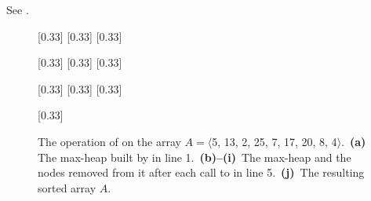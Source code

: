 See .
\begin{figure}[htb]
    \hspace*{-1.5cm}
    \newlength{\figurewidth}\setlength{\figurewidth}{\textwidth+1.5cm}
    \begin{minipage}{\figurewidth}
        \subcaptionbox{\label{fig:6.4-1a}}[0.33\figurewidth]{}
        \subcaptionbox{\label{fig:6.4-1b}}[0.33\figurewidth]{}
        \subcaptionbox{\label{fig:6.4-1c}}[0.33\figurewidth]{}
        \par\vspace{4ex}
        \subcaptionbox{\label{fig:6.4-1d}}[0.33\figurewidth]{}
        \subcaptionbox{\label{fig:6.4-1e}}[0.33\figurewidth]{}
        \subcaptionbox{\label{fig:6.4-1f}}[0.33\figurewidth]{}
        \par\vspace{4ex}
        \subcaptionbox{\label{fig:6.4-1g}}[0.33\figurewidth]{}
        \subcaptionbox{\label{fig:6.4-1h}}[0.33\figurewidth]{}
        \subcaptionbox{\label{fig:6.4-1i}}[0.33\figurewidth]{}
        \par\vspace{4ex}
        \subcaptionbox{\label{fig:6.4-1j}}[0.33\figurewidth]{}
    \end{minipage}
    \caption{The operation of  on the array $A=\langle$5, 13, 2, 25, 7, 17, 20, 8, 4$\rangle$.\,
    \textbf{(a)}\, The max-heap built by  in line 1.\,
    \textbf{(b)--(i)}\, The max-heap and the nodes removed from it after each call to  in line 5.\,
    \textbf{(j)}\, The resulting sorted array $A$.} \label{fig:6.4-1}
\end{figure}
